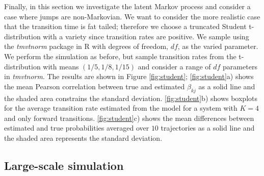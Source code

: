 Finally, in this section we investigate the latent Markov process and consider a case where jumps are non-Markovian. We want to consider the more realistic case that the transition time is fat tailed; therefore we choose a truncated Student t-distribution with a variety since transition rates are positive. We sample using the \emph{tmvtnorm} package in R with degrees of freedom, $df$, as the varied parameter. We perform the simulation as before, but sample transition rates from the t-distribution with means $(1/5, 1/8, 1/15)$ and consider a range of $df$ parameters in \emph{tmvtnorm}. The results are shown in Figure \ref{fig:student}; \ref{fig:student}a) shows the mean Pearson correlation between true and estimated $\beta_{kj}$ as a solid line and the shaded area constrains the standard deviation. \ref{fig:student}b) shows boxplots for the average transition rate estimated from the model for a system with $K=4$ and only forward transitions. \ref{fig:student}c) shows the mean differences between estimated and true probabilities averaged over $10$ trajectories as a solid line and the shaded area represents the standard deviation.


\subsection{Large-scale simulation}
\label{sec:large-scale-model}

